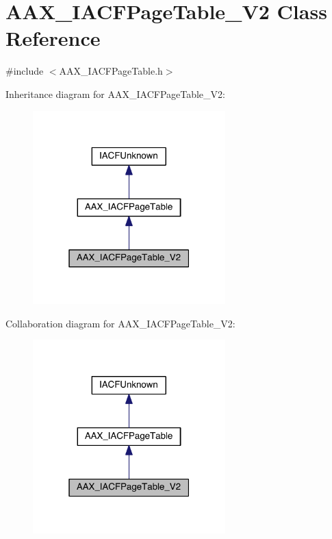 \hypertarget{a00075}{}\section{A\+A\+X\+\_\+\+I\+A\+C\+F\+Page\+Table\+\_\+\+V2 Class Reference}
\label{a00075}


{\ttfamily \#include $<$A\+A\+X\+\_\+\+I\+A\+C\+F\+Page\+Table.\+h$>$}



Inheritance diagram for A\+A\+X\+\_\+\+I\+A\+C\+F\+Page\+Table\+\_\+\+V2\+:
\nopagebreak
\begin{figure}[H]
\begin{center}
\leavevmode
\includegraphics[width=211pt]{a00568}
\end{center}
\end{figure}


Collaboration diagram for A\+A\+X\+\_\+\+I\+A\+C\+F\+Page\+Table\+\_\+\+V2\+:
\nopagebreak
\begin{figure}[H]
\begin{center}
\leavevmode
\includegraphics[width=211pt]{a00569}
\end{center}
\end{figure}


